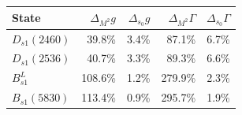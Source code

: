 \begin{tabular}{lrrrr}
\toprule
State & $\Delta_{M^2}g$ & $\Delta_{s_0}g$ & $\Delta_{M^2}\Gamma$ & $\Delta_{s_0}\Gamma$\\
\midrule
$D_{s1}(2460)$ & 39.8\% & 3.4\% & 87.1\% & 6.7\% \\
$D_{s1}(2536)$ & 40.7\% & 3.3\% & 89.3\% & 6.6\% \\
$B_{s1}^{L}$ & 108.6\% & 1.2\% & 279.9\% & 2.3\% \\
$B_{s1}(5830)$ & 113.4\% & 0.9\% & 295.7\% & 1.9\% \\
\bottomrule
\end{tabular}
